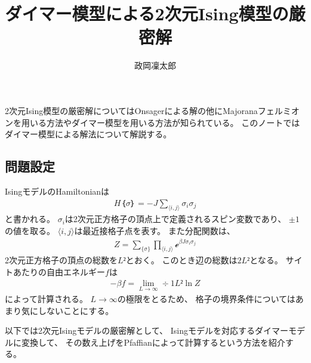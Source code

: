 \documentclass[12pt]{ltjsarticle}
\begin{document}
\title{ダイマー模型による2次元Ising模型の厳密解}
\author{政岡凜太郎}
\maketitle

2次元Ising模型の厳密解についてはOnsagerによる解の他にMajoranaフェルミオンを用いる方法やダイマー模型を用いる方法が知られている。
このノートではダイマー模型による解法について解説する。

\subsection*{
    問題設定
}
IsingモデルのHamiltonianは
\begin{align}
    H｛σ｝ = -J∑_{⟨i,j⟩}σ_iσ_j
\end{align}
と書かれる。
$σ_i$は2次元正方格子の頂点上で定義されるスピン変数であり、
$±1$の値を取る。
$⟨i,j⟩$は最近接格子点を表す。
また分配関数は、
\begin{align}
    Z = ∑_{\{σ\}}∏_{⟨i,j⟩}ℯ^{βJσ_iσ_j}
\end{align}
2次元正方格子の頂点の総数を$L²$とおく。
このとき辺の総数は$2L²$となる。
サイトあたりの自由エネルギー$f$は
\begin{align}
    -βf = \lim_{L → ∞}÷1{L²}\ln Z
\end{align}
によって計算される。
$L → ∞$の極限をとるため、
格子の境界条件についてはあまり気にしないことにする。

以下では2次元Isingモデルの厳密解として、
Isingモデルを対応するダイマーモデルに変換して、
その数え上げをPfaffianによって計算するという方法を紹介する。
\end{document}
